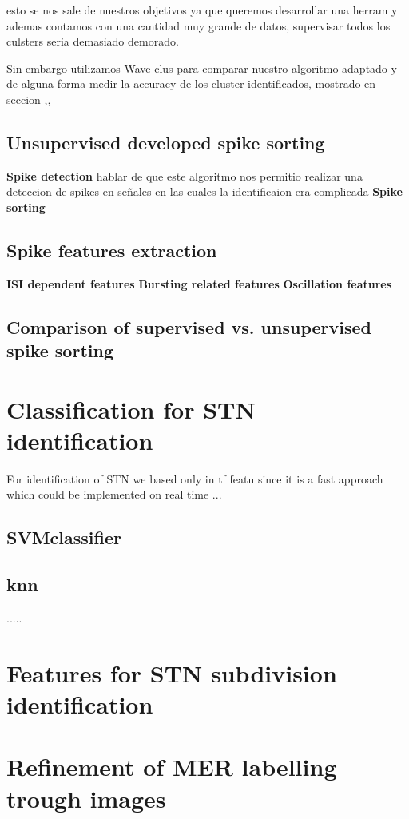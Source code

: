 esto se nos sale de nuestros objetivos ya que queremos desarrollar una herram y ademas contamos con una cantidad muy grande de datos, supervisar todos los culsters seria demasiado demorado.

Sin embargo utilizamos Wave clus para comparar nuestro algoritmo adaptado y de alguna forma medir la accuracy de los cluster identificados, mostrado en seccion ,,

\subsection{Unsupervised developed spike sorting}
\textbf{Spike detection}
hablar de que este algoritmo nos permitio realizar una deteccion de spikes en señales en las cuales la identificaion era complicada 
\textbf{Spike sorting}

\subsection{Spike features extraction}
\textbf{ISI dependent features}
\textbf{Bursting related features}
\textbf{Oscillation features}

\subsection{Comparison of supervised vs. unsupervised spike sorting}

\section{Classification for STN identification}

For identification of STN we based only in tf featu since it is a fast approach which could be implemented on real time ...
\subsection{SVMclassifier}
\subsection{knn}
.....
\section{Features for STN subdivision identification}

\section{Refinement of MER labelling trough images}


